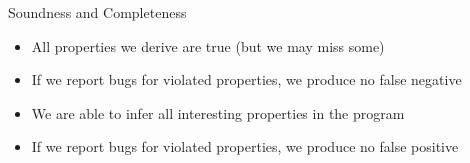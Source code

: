\begin{frame}{Soundness and Completeness}
   \vspace*{-2mm}
   \begin{itemize}
      \item<3-> All properties we derive are true (but we may miss some)
      \item<4-> If we report bugs for violated properties, we produce no false negative
   \end{itemize}
   \bigskip

   \vspace*{-2mm}
   \begin{itemize}
      \item<6-> We are able to infer all interesting properties in the program
      \item<7-> If we report bugs for violated properties, we produce no false positive
   \end{itemize}
   \begin{center}
   \end{center}
\end{frame}


